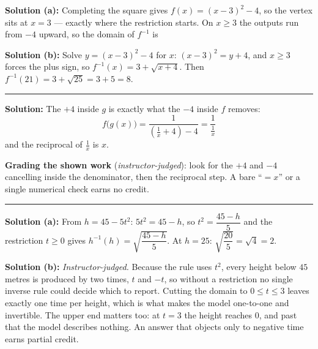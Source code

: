 \documentclass[12pt]{article}
\begin{document}

\textbf{Solution (a):} Completing the square gives $f(x) = (x - 3)^{2} - 4$, so the vertex sits at $x = 3$ --- exactly where the restriction starts. On $x \geq 3$ the outputs run from $-4$ upward, so the domain of $f^{-1}$ is 

\textbf{Solution (b):} Solve $y = (x-3)^{2} - 4$ for $x$: $(x-3)^{2} = y + 4$, and $x \geq 3$ forces the plus sign, so $f^{-1}(x) = 3 + \sqrt{x+4}$. Then $f^{-1}(21) = 3 + \sqrt{25} = 3 + 5 = 8$. 

\vspace{0.1cm}\noindent\rule{\linewidth}{0.2pt}


\textbf{Solution:} The $+4$ inside $g$ is exactly what the $-4$ inside $f$ removes:
\[ f\bigl(g(x)\bigr) = \frac{1}{\left(\frac{1}{x} + 4\right) - 4} = \frac{1}{\frac{1}{x}} \]
and the reciprocal of $\tfrac{1}{x}$ is $x$. 

\textbf{Grading the shown work} (\emph{instructor-judged}): look for the $+4$ and $-4$ cancelling inside the denominator, then the reciprocal step. A bare ``$= x$'' or a single numerical check earns no credit.

\vspace{0.1cm}\noindent\rule{\linewidth}{0.2pt}


\textbf{Solution (a):} From $h = 45 - 5t^{2}$: $5t^{2} = 45 - h$, so $t^{2} = \dfrac{45 - h}{5}$ and the restriction $t \geq 0$ gives $h^{-1}(h) = \sqrt{\dfrac{45-h}{5}}$. At $h = 25$: $\sqrt{\dfrac{20}{5}} = \sqrt{4} = 2$. 

\textbf{Solution (b):} \emph{Instructor-judged.} Because the rule uses $t^{2}$, every height below $45$ metres is produced by two times, $t$ and $-t$, so without a restriction no single inverse rule could decide which to report. Cutting the domain to $0 \leq t \leq 3$ leaves exactly one time per height, which is what makes the model one-to-one and invertible. The upper end matters too: at $t = 3$ the height reaches $0$, and past that the model describes nothing. An answer that objects only to negative time earns partial credit.
\end{document}
